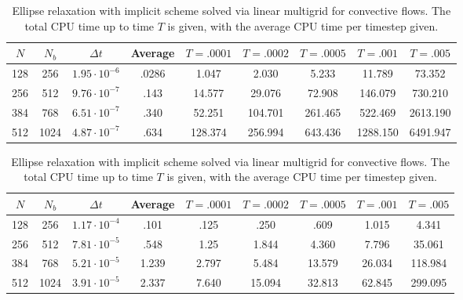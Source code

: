 \documentclass[preprint,12pt]{elsarticle}
\begin{document}
\begin{table}
\caption{Ellipse relaxation with Forward Euler/Backward Euler scheme for convective flows. The total CPU time up to time $T$ is given, with the average CPU time per timestep given.}
\label{table:EllipseFEBESims}
\begin{center}
\begin{tabular}{|c||c c|c|c c c c c|}
\hline
$N$ & $N_b$ & $\Delta t$ & Average & $T=.0001$ & $T=.0002$ & $T=.0005$ &$T=.001$ &$T=.005$\\
\hline
128 & 256 & $1.95\cdot 10^{-6}$ & .0286 & 1.047 & 2.030 & 5.233 & 11.789 & 73.352 \\
256 & 512 & $9.76\cdot 10^{-7}$ & .143 & 14.577 & 29.076 & 72.908 & 146.079 & 730.210\\
384 & 768 & $6.51\cdot 10^{-7}$ &.340 & 52.251 & 104.701 & 261.465 & 522.469 & 2613.190\\
512 & 1024 & $4.87\cdot 10^{-7}$ &.634 & 128.374 & 256.994 & 643.436 & 1288.150 & 6491.947\\
\hline
\end{tabular}
\end{center}

\caption{Ellipse relaxation with implicit scheme solved via linear multigrid for convective flows. The total CPU time up to time $T$ is given, with the average CPU time per timestep given.}
\label{table:EllipseImplicitSims}
\begin{center}
\begin{tabular}{|c||c c|c|c c c c c|}
\hline
$N$ & $N_b$ & $\Delta t$ & Average & $T=.0001$ & $T=.0002$ & $T=.0005$ &$T=.001$ &$T=.005$\\
\hline
128 & 256 & $1.17\cdot 10^{-4}$ & .101 & .125 & .250 & .609 & 1.015 & 4.341 \\
256 & 512 & $7.81\cdot 10^{-5}$ & .548 & 1.25 & 1.844 & 4.360 & 7.796 & 35.061\\
384 & 768 & $5.21\cdot 10^{-5}$ & 1.239 & 2.797 & 5.484 & 13.579 & 26.034 & 118.984\\
512 & 1024 & $3.91\cdot 10^{-5}$ & 2.337 & 7.640 & 15.094 & 32.813 & 62.845 & 299.095\\
\hline
\end{tabular}
\end{center}


\end{table}
\end{document}
